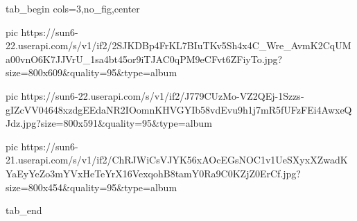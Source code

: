  
 
 
 
 


\ifcmt
  tab_begin cols=3,no_fig,center

     pic https://sun6-22.userapi.com/s/v1/if2/2SJKDBp4FrKL7BIuTKv5Sh4x4C_Wre_AvmK2CqUMa00vnO6K7JJVrU_1sa4bt45or9iTJAC0qPM9eCFvt6ZFiyTo.jpg?size=800x609&quality=95&type=album

     pic https://sun6-22.userapi.com/s/v1/if2/J779CUzMo-VZ2QEj-1Szzs-gIZcVV04648xzdgEEdaNR2IOomnKHVGYIb58vdEvu9h1j7mR5fUFzFEi4AwxeQJdz.jpg?size=800x591&quality=95&type=album

     pic https://sun6-21.userapi.com/s/v1/if2/ChRJWiCsVJYK56xAOcEGsNOC1v1UeSXyxXZwadKYaEyYeZo3mYVxHeTeYrX16VexqohB8tamY0Ra9C0KZjZ0ErCf.jpg?size=800x454&quality=95&type=album

  tab_end
\fi
